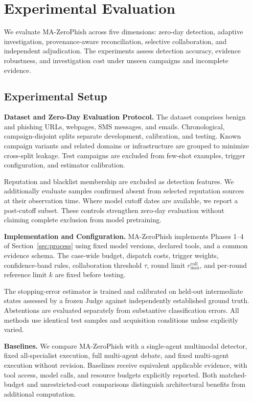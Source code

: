 \section{Experimental Evaluation}
\label{sec:evaluation}

We evaluate MA-ZeroPhish across five
dimensions: zero-day detection,
adaptive investigation, provenance-aware
reconciliation, selective collaboration,
and independent adjudication. The
experiments assess detection accuracy,
evidence robustness, and investigation
cost under unseen campaigns and
incomplete evidence.

\subsection{Experimental Setup}
\label{sec:exp-setup}

\noindent\textbf{Dataset and Zero-Day
Evaluation Protocol.}
The dataset comprises benign and phishing
URLs, webpages, SMS messages, and emails.
Chronological, campaign-disjoint splits
separate development, calibration, and
testing. Known campaign variants and
related domains or infrastructure are
grouped to minimize cross-split leakage.
Test campaigns are excluded from
few-shot examples, trigger configuration,
and estimator calibration.

Reputation and blacklist membership
are excluded as detection features.
We additionally evaluate samples
confirmed absent from selected reputation
sources at their observation time.
Where model cutoff dates are available,
we report a post-cutoff subset.
These controls strengthen zero-day
evaluation without claiming complete
exclusion from model pretraining.

\medskip
\noindent\textbf{Implementation and
Configuration.}
MA-ZeroPhish implements Phases 1--4 of Section~\ref{sec:process} using fixed model versions, declared
tools, and a common evidence schema.
The case-wide budget, dispatch costs,
trigger weights, confidence-band rules,
collaboration threshold $\tau$, round
limit $r_{\max}^{\mathrm{coll}}$, and
per-round reference limit $k$ are
fixed before testing.

The stopping-error estimator is trained
and calibrated on held-out intermediate
states assessed by a frozen Judge
against independently established
ground truth. Abstentions are evaluated
separately from substantive classification
errors. All methods use identical test
samples and acquisition conditions
unless explicitly varied.

\medskip
\noindent\textbf{Baselines.}
We compare MA-ZeroPhish with a
single-agent multimodal detector,
fixed all-specialist execution,
full multi-agent debate, and fixed
multi-agent execution without revision.
Baselines receive equivalent applicable
evidence, with tool access, model calls,
and resource budgets explicitly reported.
Both matched-budget and unrestricted-cost
comparisons distinguish architectural
benefits from additional computation.


